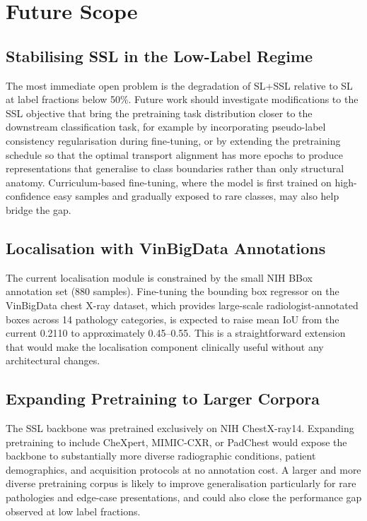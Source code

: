 \section{Future Scope}
\label{sec:future}

\subsection{Stabilising SSL in the Low-Label Regime}

The most immediate open problem is the degradation of SL+SSL relative to SL at label fractions below 50\%. Future work should investigate modifications to the SSL objective that bring the pretraining task distribution closer to the downstream classification task, for example by incorporating pseudo-label consistency regularisation during fine-tuning, or by extending the pretraining schedule so that the optimal transport alignment has more epochs to produce representations that generalise to class boundaries rather than only structural anatomy. Curriculum-based fine-tuning, where the model is first trained on high-confidence easy samples and gradually exposed to rare classes, may also help bridge the gap.

\subsection{Localisation with VinBigData Annotations}

The current localisation module is constrained by the small NIH BBox annotation set (880 samples). Fine-tuning the bounding box regressor on the VinBigData chest X-ray dataset, which provides large-scale radiologist-annotated boxes across 14 pathology categories, is expected to raise mean IoU from the current 0.2110 to approximately 0.45--0.55. This is a straightforward extension that would make the localisation component clinically useful without any architectural changes.

\subsection{Expanding Pretraining to Larger Corpora}

The SSL backbone was pretrained exclusively on NIH ChestX-ray14. Expanding pretraining to include CheXpert, MIMIC-CXR, or PadChest would expose the backbone to substantially more diverse radiographic conditions, patient demographics, and acquisition protocols at no annotation cost. A larger and more diverse pretraining corpus is likely to improve generalisation particularly for rare pathologies and edge-case presentations, and could also close the performance gap observed at low label fractions.

